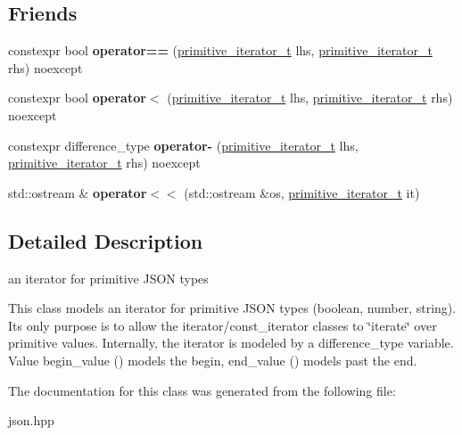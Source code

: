 \subsection*{Friends}
\begin{DoxyCompactItemize}
\item 
\mbox{\label{classnlohmann_1_1detail_1_1primitive__iterator__t_aae1e1e2ec0e229d1291d69de57d76bbe}} 
constexpr bool {\bfseries operator==} (\hyperlink{classnlohmann_1_1detail_1_1primitive__iterator__t}{primitive\+\_\+iterator\+\_\+t} lhs, \hyperlink{classnlohmann_1_1detail_1_1primitive__iterator__t}{primitive\+\_\+iterator\+\_\+t} rhs) noexcept
\item 
\mbox{\label{classnlohmann_1_1detail_1_1primitive__iterator__t_a901a95e6d73c9509d3dcde914f6c8a9d}} 
constexpr bool {\bfseries operator$<$} (\hyperlink{classnlohmann_1_1detail_1_1primitive__iterator__t}{primitive\+\_\+iterator\+\_\+t} lhs, \hyperlink{classnlohmann_1_1detail_1_1primitive__iterator__t}{primitive\+\_\+iterator\+\_\+t} rhs) noexcept
\item 
\mbox{\label{classnlohmann_1_1detail_1_1primitive__iterator__t_ac6d902d6ec9a02dabed5452d3ae78f7e}} 
constexpr difference\+\_\+type {\bfseries operator-\/} (\hyperlink{classnlohmann_1_1detail_1_1primitive__iterator__t}{primitive\+\_\+iterator\+\_\+t} lhs, \hyperlink{classnlohmann_1_1detail_1_1primitive__iterator__t}{primitive\+\_\+iterator\+\_\+t} rhs) noexcept
\item 
\mbox{\label{classnlohmann_1_1detail_1_1primitive__iterator__t_a653e8be3b4fb047e8b4460cd932f2b52}} 
std\+::ostream \& {\bfseries operator$<$$<$} (std\+::ostream \&os, \hyperlink{classnlohmann_1_1detail_1_1primitive__iterator__t}{primitive\+\_\+iterator\+\_\+t} it)
\end{DoxyCompactItemize}


\subsection{Detailed Description}
an iterator for primitive J\+S\+ON types 

This class models an iterator for primitive J\+S\+ON types (boolean, number, string). It\textquotesingle{}s only purpose is to allow the iterator/const\+\_\+iterator classes to \char`\"{}iterate\char`\"{} over primitive values. Internally, the iterator is modeled by a {\ttfamily difference\+\_\+type} variable. Value begin\+\_\+value ({}) models the begin, end\+\_\+value ({}) models past the end. 

The documentation for this class was generated from the following file\+:\begin{DoxyCompactItemize}
\item 
json.\+hpp\end{DoxyCompactItemize}
